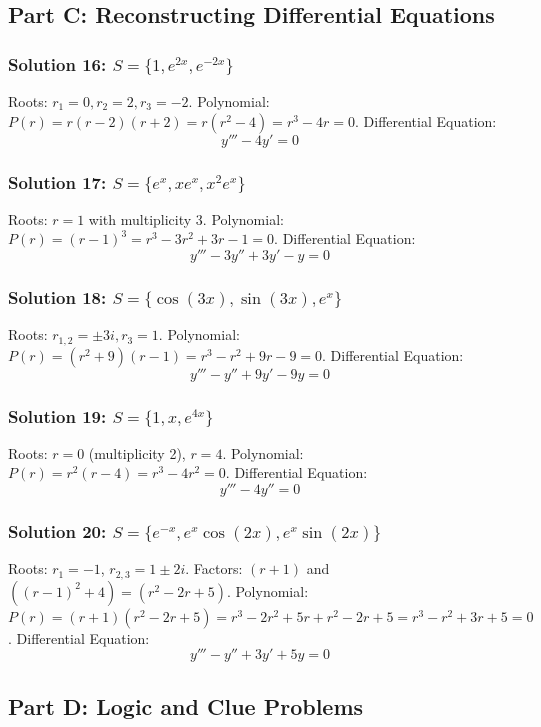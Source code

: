 \documentclass[11pt,letterpaper]{article}
\begin{document}
\subsection*{Part C: Reconstructing Differential Equations}

\subsubsection*{Solution 16: $S = \{1, e^{2x}, e^{-2x}\}$}
Roots: $r_1 = 0, r_2 = 2, r_3 = -2$.
Polynomial: $P(r) = r(r-2)(r+2) = r(r^2 - 4) = r^3 - 4r = 0$.
Differential Equation:
\[ y''' - 4y' = 0 \]

\subsubsection*{Solution 17: $S = \{e^x, x e^x, x^2 e^x\}$}
Roots: $r = 1$ with multiplicity 3.
Polynomial: $P(r) = (r-1)^3 = r^3 - 3r^2 + 3r - 1 = 0$.
Differential Equation:
\[ y''' - 3y'' + 3y' - y = 0 \]

\subsubsection*{Solution 18: $S = \{\cos(3x), \sin(3x), e^x\}$}
Roots: $r_{1,2} = \pm 3i, r_3 = 1$.
Polynomial: $P(r) = (r^2 + 9)(r - 1) = r^3 - r^2 + 9r - 9 = 0$.
Differential Equation:
\[ y''' - y'' + 9y' - 9y = 0 \]

\subsubsection*{Solution 19: $S = \{1, x, e^{4x}\}$}
Roots: $r = 0$ (multiplicity 2), $r = 4$.
Polynomial: $P(r) = r^2(r - 4) = r^3 - 4r^2 = 0$.
Differential Equation:
\[ y''' - 4y'' = 0 \]

\subsubsection*{Solution 20: $S = \{e^{-x}, e^x \cos(2x), e^x \sin(2x)\}$}
Roots: $r_1 = -1$, $r_{2,3} = 1 \pm 2i$.
Factors: $(r+1)$ and $((r-1)^2 + 4) = (r^2 - 2r + 5)$.
Polynomial: $P(r) = (r+1)(r^2 - 2r + 5) = r^3 - 2r^2 + 5r + r^2 - 2r + 5 = r^3 - r^2 + 3r + 5 = 0$.
Differential Equation:
\[ y''' - y'' + 3y' + 5y = 0 \]

\subsection*{Part D: Logic and Clue Problems}
\end{document}

